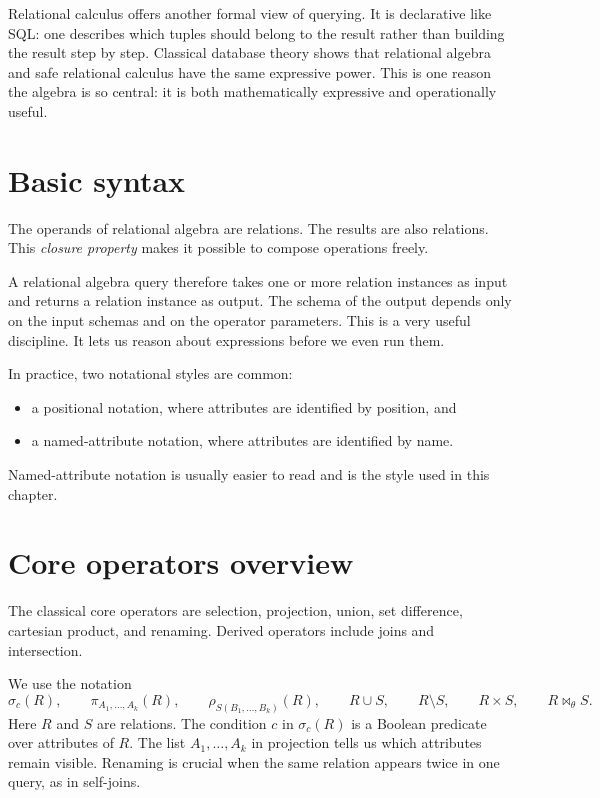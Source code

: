 \documentclass[11pt,a4paper,openany]{book}
\newcommand{\RAselect}{\sigma}
\newcommand{\RAproject}{\pi}
\newcommand{\RArename}{\rho}
\newcommand{\join}{\bowtie}
\begin{document}
Relational calculus offers another formal view of querying. It is declarative like SQL: one describes which tuples should belong to the result rather than building the result step by step. Classical database theory shows that relational algebra and safe relational calculus have the same expressive power. This is one reason the algebra is so central: it is both mathematically expressive and operationally useful.

\section{Basic syntax}
The operands of relational algebra are relations. The results are also relations. This \emph{closure property} makes it possible to compose operations freely.

A relational algebra query therefore takes one or more relation instances as input and returns a relation instance as output. The schema of the output depends only on the input schemas and on the operator parameters. This is a very useful discipline. It lets us reason about expressions before we even run them.

In practice, two notational styles are common:
\begin{itemize}
\item a positional notation, where attributes are identified by position, and
\item a named-attribute notation, where attributes are identified by name.
\end{itemize}

Named-attribute notation is usually easier to read and is the style used in this chapter.

\section{Core operators overview}
The classical core operators are selection, projection, union, set difference, cartesian product, and renaming. Derived operators include joins and intersection.

We use the notation
\[
\RAselect_c(R), \qquad
\RAproject_{A_1,\dots,A_k}(R), \qquad
\RArename_{S(B_1,\dots,B_k)}(R), \qquad
R \cup S, \qquad R \setminus S, \qquad R \times S, \qquad R \join_\theta S.
\]
Here \(R\) and \(S\) are relations. The condition \(c\) in \(\RAselect_c(R)\) is a Boolean predicate over attributes of \(R\). The list \(A_1,\dots,A_k\) in projection tells us which attributes remain visible. Renaming is crucial when the same relation appears twice in one query, as in self-joins.
\end{document}
